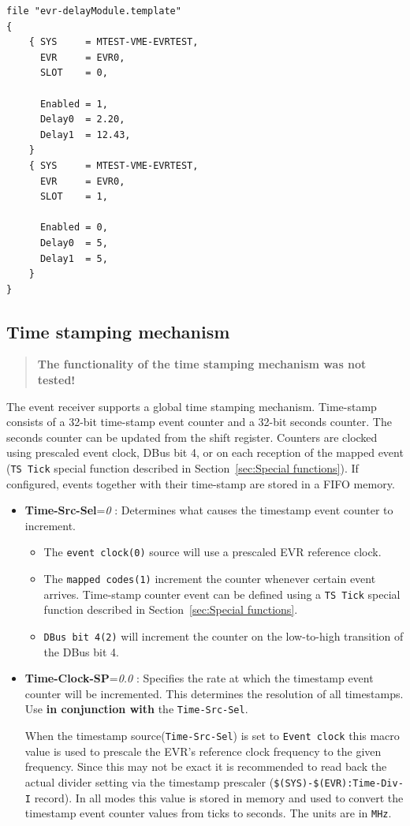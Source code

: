\documentclass[12pt,a4paper]{article}
\begin{document}
\begin{verbatim}
file "evr-delayModule.template"
{
    { SYS     = MTEST-VME-EVRTEST,
      EVR     = EVR0,
      SLOT    = 0,

      Enabled = 1,
      Delay0  = 2.20,
      Delay1  = 12.43,
    }
    { SYS     = MTEST-VME-EVRTEST,
      EVR     = EVR0,
      SLOT    = 1,

      Enabled = 0,
      Delay0  = 5,
      Delay1  = 5,
    }
}
\end{verbatim}

\subsection{Time stamping mechanism}\label{sec:Time stamping mechanism}
\begin{quote}
\textbf{The functionality of the time stamping mechanism was not tested!}
\end{quote}
The event receiver supports a global time stamping mechanism. Time-stamp consists of a 32-bit time-stamp event counter and a 32-bit seconds counter. The seconds counter can be updated from the
shift register. Counters are clocked using prescaled event clock, DBus bit 4, or on each reception of the mapped event (\texttt{TS Tick} special function described in Section~\ref{sec:Special functions}). If configured, events together with their time-stamp are stored in a FIFO memory.

\begin{itemize}
\item
	\textbf{Time-Src-Sel}=\emph{0} : Determines what causes the
timestamp event counter to increment.

\begin{itemize}
\item
  The \texttt{event clock(0)} source will use a prescaled EVR
  reference clock.
\item
  The \texttt{mapped codes(1)} increment the counter whenever
  certain event arrives. Time-stamp counter event can be defined using a \texttt{TS Tick} special function described in Section~\ref{sec:Special functions}.
\item
  \texttt{DBus bit 4(2)} will increment the counter on the
  low-to-high transition of the DBus bit 4.
\end{itemize}
\item
	\textbf{Time-Clock-SP}=\emph{0.0} : Specifies the rate at which the
timestamp event counter will be incremented. This determines the
resolution of all timestamps. Use \textbf{in conjunction with} the \texttt{Time-Src-Sel}.

When the timestamp source(\texttt{Time-Src-Sel}) is set to \texttt{Event clock}
this macro value is used to prescale the EVR's reference clock
frequency to the given frequency. Since this may not be exact it is
recommended to read back the actual divider setting via the
timestamp prescaler (\texttt{\$(SYS)-\$(EVR):Time-Div-I} record). In
all modes this value is stored in memory and used to convert the
timestamp event counter values from ticks to seconds. The units are
in \texttt{MHz}.
\end{itemize}
\end{document}
